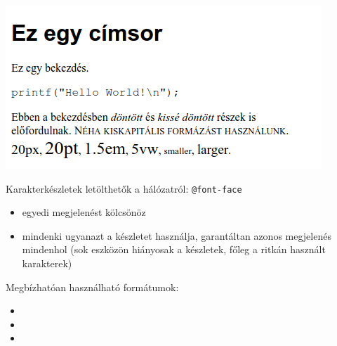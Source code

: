 \begin{frame}
  \begin{center}
    \includegraphics[scale=0.6]{karakter.png}
  \end{center}
\end{frame}

\begin{frame}
  Karakterkészletek letölthetők a hálózatról: \texttt{@font-face}
  \begin{itemize}
    \item egyedi megjelenést kölcsönöz
    \item mindenki ugyanazt a készletet használja, garantáltan azonos megjelenés mindenhol (sok eszközön hiányosak a készletek, főleg a ritkán használt karakterek)
  \end{itemize}
  \vfill
  Megbízhatóan használható formátumok:
  \begin{itemize}
    \item {}
    \item {}
    \item {}
  \end{itemize}
\end{frame}

